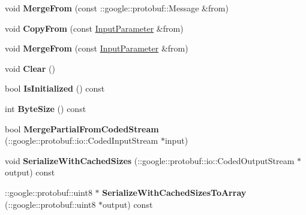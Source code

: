 \begin{DoxyCompactItemize}
void {\bfseries Merge\+From} (const \+::google\+::protobuf\+::\+Message \&from)
\item 
\mbox{\label{classcaffe_1_1_input_parameter_a29f83de0edab49e2b3f6513dad9edbe1}} 
void {\bfseries Copy\+From} (const \mbox{\hyperlink{classcaffe_1_1_input_parameter}{Input\+Parameter}} \&from)
\item 
\mbox{\label{classcaffe_1_1_input_parameter_aadbd380c130fe19d180eaf672f213aee}} 
void {\bfseries Merge\+From} (const \mbox{\hyperlink{classcaffe_1_1_input_parameter}{Input\+Parameter}} \&from)
\item 
\mbox{\label{classcaffe_1_1_input_parameter_ac0cc68374975b3977a5c23895f8cb7c5}} 
void {\bfseries Clear} ()
\item 
\mbox{\label{classcaffe_1_1_input_parameter_ac5f269ec2212895a146af569361848c2}} 
bool {\bfseries Is\+Initialized} () const
\item 
\mbox{\label{classcaffe_1_1_input_parameter_a0063a825e6b45cbef3846e10c7e441ff}} 
int {\bfseries Byte\+Size} () const
\item 
\mbox{\label{classcaffe_1_1_input_parameter_aab3affa1ae02125b7ddbcad57a15c8d7}} 
bool {\bfseries Merge\+Partial\+From\+Coded\+Stream} (\+::google\+::protobuf\+::io\+::\+Coded\+Input\+Stream $\ast$input)
\item 
\mbox{\label{classcaffe_1_1_input_parameter_a42b49dc166a375a80706fd44f28bb073}} 
void {\bfseries Serialize\+With\+Cached\+Sizes} (\+::google\+::protobuf\+::io\+::\+Coded\+Output\+Stream $\ast$output) const
\item 
\mbox{\label{classcaffe_1_1_input_parameter_a6b77146d6eb35be06343db2ea82acae0}} 
\+::google\+::protobuf\+::uint8 $\ast$ {\bfseries Serialize\+With\+Cached\+Sizes\+To\+Array} (\+::google\+::protobuf\+::uint8 $\ast$output) const
\item 
\mbox{\label{classcaffe_1_1_input_parameter_a8ae4be0b9e6bffc299997e50196760f1}} 

\end{DoxyCompactItemize}
